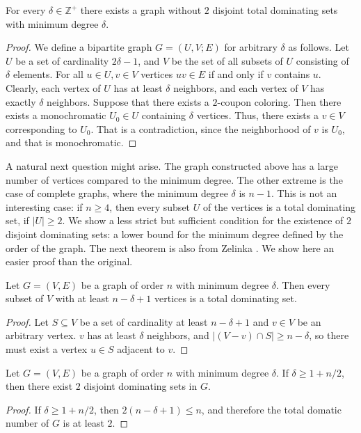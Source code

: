 \begin{thm}
  For every $\delta \in \mathbb{Z}^+$ there exists a graph without $2$
  disjoint total dominating sets with minimum degree $\delta$.
\end{thm}
\begin{proof}
  We define a bipartite graph $G = (U, V ; E)$ for arbitrary $\delta$ as follows.
  Let $U$ be a set of cardinality $2\delta - 1$, and $V$ be the set of all subsets of
  $U$ consisting of $\delta$ elements. For all $ u \in U, v \in V$ vertices $uv \in E$
  if and only if $v$ contains $u$. Clearly, each vertex of $U$ has at least $\delta$
  neighbors, and each vertex of $V$ has exactly $\delta$ neighbors. Suppose that
  there exists a $2$-coupon coloring. Then there exists a monochromatic $U_0 \in U$
  containing $\delta$ vertices. Thus, there exists a $v \in V$ corresponding to $U_0$.
  That is a contradiction, since the neighborhood of $v$ is $U_0$, and that is monochromatic.
\end{proof}

A natural next question might arise. The graph constructed above has a large number
of vertices compared to the minimum degree. The other extreme is the case of
complete graphs, where the minimum degree $\delta$ is $n - 1$. This is not an interesting case:
if $n \ge 4$, then every subset $U$ of the vertices is a total dominating set, if $|U| \ge 2$.
We show a less strict but sufficient condition for the existence of $2$ disjoint dominating sets:
a lower bound for the minimum degree defined by the order of the graph.
The next theorem is also from Zelinka \cite{zelinka}. We show here an easier proof than
the original.

\begin{claim}
  Let $G = (V,E)$ be a graph of order $n$ with minimum degree $\delta$. Then every subset
  of $V$ with at least $n - \delta + 1$ vertices is a total dominating set.
\end{claim}
\begin{proof}
  Let $S \subseteq V$ be a set of cardinality at least $n - \delta + 1$ and $v \in V$ be
  an arbitrary vertex. $v$ has at least $\delta$ neighbors, and $|(V - v) \cap S| \ge
  n - \delta$, so there must exist a vertex $u \in S$ adjacent to $v$.
\end{proof}

\begin{cor}
  Let $G = (V,E)$ be a graph of order $n$ with minimum degree $\delta$. If $\delta \ge 1 + n/2$,
  then there exist $2$ disjoint dominating sets in $G$.
\end{cor}
\begin{proof}
  If $\delta \ge 1 + n/2$, then $2(n - \delta + 1) \le n$, and therefore the total
  domatic number of $G$ is at least $2$.
\end{proof}

